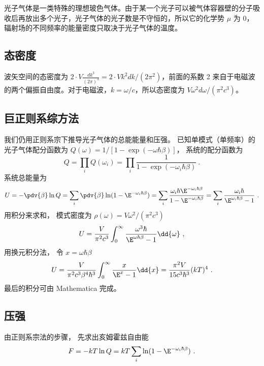 
\begin{issues}
\issueDraft
\end{issues}
光子气体是一类特殊的理想玻色气体。由于某一个光子可以被气体容器壁的分子吸收后再放出多个光子，光子气体的光子数是不守恒的，所以它的化学势 $\mu$ 为 $0$，辐射场的不同频率的能量密度只取决于光子气体的温度。
\subsection{态密度}
波矢空间的态密度为 $2\cdot V \frac{dk^3}{(2\pi)^3}=2\cdot Vk^2dk/(2\pi^2)$，前面的系数 2 来自于电磁波的两个偏振自由度。对于电磁波，$k=\omega/c$，所以态密度为 $V \omega^2 d\omega/(\pi^2 c^3)$。
\subsection{巨正则系综方法}
我们仍用正则系宗下推导光子气体的总能能量和压强。 已知单模式（单频率）的光子气体配分函数为 $Q(\omega) = 1/[1-\exp(-\omega\hbar\beta)]$， 系统的配分函数为
\begin{equation}
Q = \prod_i Q(\omega_i) = \prod_i \frac{1}{1-\exp(-\omega_i\hbar\beta)}~.
\end{equation}
系统总能量为
\begin{equation}
U = -\pdv{\beta} \ln Q = \sum_i \pdv{\beta} \ln(1 - \E^{-\omega_i \hbar \beta}) = \sum_i \frac{\omega_i \hbar \E^{-\omega_i \hbar\beta}}{1-\E^{-\omega_i \hbar \beta}} = \sum_i \frac{\omega_i \hbar}{\E^{\omega_i\hbar\beta} - 1}~.
\end{equation}
用积分来求和， 模式密度为 $\rho(\omega) = V\omega^2/(\pi^2 c^3)$
\begin{equation}
U = \frac{V}{\pi^2 c^3} \int_0^\infty \frac{\omega^3 \hbar}{\E^{\omega\hbar\beta} - 1}\dd{\omega}~,
\end{equation}
用换元积分法， 令 $x = \omega\hbar\beta$
\begin{equation}
U = \frac{V}{\pi^2c^3 \beta^4 \hbar^3} \int_0^\infty \frac{x}{\E^x - 1}\dd{x} = \frac{\pi^2 V}{15c^3 \hbar^3} (kT)^4~.
\end{equation}
最后的积分可由 Mathematica 完成。

\subsection{压强}
由正则系宗法的步骤， 先求出亥姆霍兹自由能
\begin{equation}
F = -kT \ln Q = kT \sum_i \ln(1 - \E^{-\omega_i \hbar\beta})~.
\end{equation}
